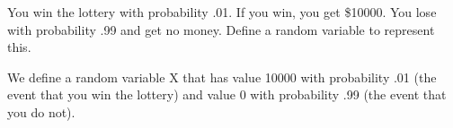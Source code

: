 \question You win the lottery with probability .01. If you win, you get \$10000. You lose with probability .99 and get no money. Define a random variable to represent this. 

\begin{solution}[1cm]
We define a random variable X that has value 10000 with probability .01 (the event that you win the lottery) and value 0 with probability .99 (the event that you do not). 
\end{solution}

